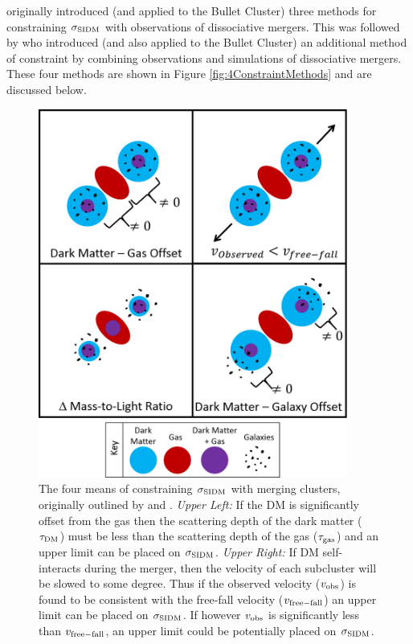 \citet{Markevitch:2004dl} originally introduced (and applied to the Bullet Cluster) three methods for constraining $\sigma_{\rm SIDM}$ with observations of dissociative mergers.
This was followed by \citet{Randall:2008hs} who introduced (and also applied to the Bullet Cluster) an additional method of constraint by combining observations and simulations of dissociative mergers.
These four methods are shown in Figure \ref{fig:4ConstraintMethods} and are discussed below.

\begin{figure}
\centering
\includegraphics[width=4in]{Chapter1/4ConstraintMethods.png}
\caption[The four means of constraining $\sigma_{\rm SIDM}$ with merging clusters.]{The four means of constraining $\sigma_{\rm SIDM}$ with merging clusters, originally outlined by \citet{Markevitch:2004dl} and \citet{Randall:2008hs}. 
\emph{Upper Left:} If the DM is significantly offset from the gas then the scattering depth of the dark matter ($\tau_{\rm DM}$) must be less than the scattering depth of the gas ($\tau_{\rm gas}$) and an upper limit can be placed on $\sigma_{\rm SIDM}$.
\emph{Upper Right:} If DM self-interacts during the merger, then the velocity of each subcluster will be slowed to some degree.
Thus if the observed velocity ($v_{\rm obs}$) is found to be consistent with the free-fall velocity ($v_{\rm free-fall}$) an upper limit can be placed on $\sigma_{\rm SIDM}$.
If however $v_{\rm obs}$ is significantly less than $v_{\rm free-fall}$, an upper limit could be potentially placed on $\sigma_{\rm SIDM}$.
}
\end{figure}
